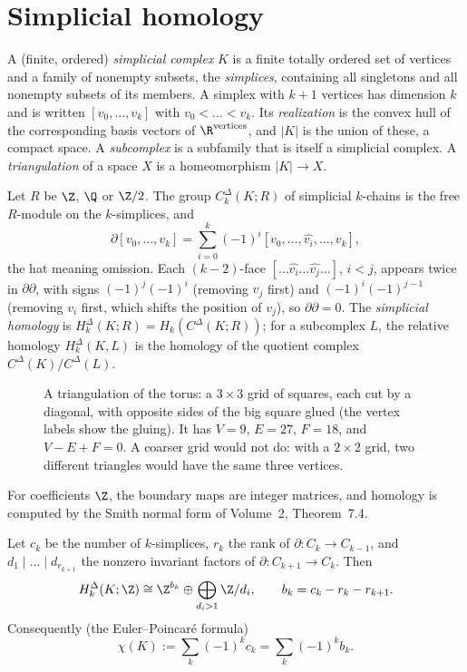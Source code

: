 \section{Simplicial homology}

\begin{definition}
A (finite, ordered) \emph{simplicial complex} $K$ is a finite totally ordered set of vertices and a family of nonempty subsets, the \emph{simplices}, containing all singletons and all
nonempty subsets of its members. A simplex with $k+1$ vertices has dimension $k$ and is written $[v_0,\dots,v_k]$ with $v_0<\dots<v_k$. Its \emph{realization} is the convex hull of the
corresponding basis vectors of $\R^{\text{vertices}}$, and $|K|$ is the union of these, a compact space. A \emph{subcomplex} is a subfamily that is itself a simplicial complex. A
\emph{triangulation} of a space $X$ is a homeomorphism $|K|\to X$.
\end{definition}

Let $R$ be $\Z$, $\Q$ or $\Z/2$. The group $C^\Delta_k(K;R)$ of simplicial $k$-chains is the free $R$-module on the $k$-simplices, and
\[\partial[v_0,\dots,v_k]=\sum_{i=0}^k(-1)^i[v_0,\dots,\widehat{v_i},\dots,v_k],\]
the hat meaning omission. Each $(k-2)$-face $[\dots\widehat{v_i}\dots\widehat{v_j}\dots]$, $i<j$, appears twice in $\partial\partial$, with signs $(-1)^j(-1)^i$ (removing $v_j$ first) and $(-1)^i(-1)^{j-1}$ (removing
$v_i$ first, which shifts the position of $v_j$), so $\partial\partial=0$. The \emph{simplicial homology} is $H^\Delta_k(K;R)=H_k(C^\Delta(K;R))$; for a subcomplex $L$, the relative homology $H^\Delta_k(K,L)$ is the
homology of the quotient complex $C^\Delta(K)/C^\Delta(L)$.

\begin{figure}[ht]
\centering
{}
\caption{A triangulation of the torus: a $3\times3$ grid of squares, each cut by a diagonal, with opposite sides of the big square glued (the vertex labels show the
gluing). It has $V=9$, $E=27$, $F=18$, and $V-E+F=0$. A coarser grid would not do: with a $2\times2$ grid, two different triangles would have the same three vertices.}
\label{fig:torustriang}
\end{figure}

For coefficients $\Z$, the boundary maps are integer matrices, and homology is computed by the Smith normal form of Volume~2, Theorem~7.4.

\begin{proposition}\label{prop:smithhomology}
Let $c_k$ be the number of $k$-simplices, $r_k$ the rank of $\partial\colon C_k\to C_{k-1}$, and $d_1\mid\dots\mid d_{r_{k+1}}$ the nonzero invariant factors of $\partial\colon C_{k+1}\to C_k$. Then
\[H^\Delta_k(K;\Z)\cong\Z^{b_k}\oplus\bigoplus_{d_i>1}\Z/d_i,\qquad b_k=c_k-r_k-r_{k+1}.\]
Consequently (the Euler--Poincar\'e formula)
\[\chi(K):=\sum_k(-1)^kc_k=\sum_k(-1)^kb_k.\]
\end{proposition}

